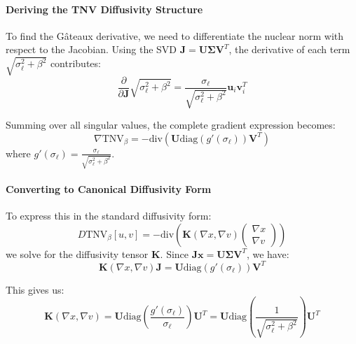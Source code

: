 \paragraph{Deriving the TNV Diffusivity Structure}

To find the Gâteaux derivative, we need to differentiate the nuclear norm with respect to the Jacobian. Using the SVD $\mathbf{J} = \mathbf{U}\boldsymbol{\Sigma}\mathbf{V}^T$, the derivative of each term $\sqrt{\sigma_\ell^2 + \beta^2}$ contributes:
\begin{equation}
\frac{\partial}{\partial \mathbf{J}}\sqrt{\sigma_\ell^2 + \beta^2} = \frac{\sigma_\ell}{\sqrt{\sigma_\ell^2 + \beta^2}} \mathbf{u}_i \mathbf{v}_i^T
\end{equation}

Summing over all singular values, the complete gradient expression becomes:
\begin{equation}
\nabla \text{TNV}_\beta = -\text{div}\left(\mathbf{U} \text{diag}(g'(\sigma_\ell)) \mathbf{V}^T\right)
\end{equation}
where $g'(\sigma_\ell) = \frac{\sigma_\ell}{\sqrt{\sigma_\ell^2 + \beta^2}}$.

\paragraph{Converting to Canonical Diffusivity Form}

To express this in the standard diffusivity form:
\begin{equation}
D\text{TNV}_\beta[u,v] = -\text{div}\left(\mathbf{K}(\nabla x, \nabla v) \begin{pmatrix} \nabla x \\ \nabla v \end{pmatrix}\right)
\end{equation}
we solve for the diffusivity tensor $\mathbf{K}$. Since $\mathbf{J} \mathbf{x} = \mathbf{U}\boldsymbol{\Sigma}\mathbf{V}^T$, we have:
\begin{equation}
\mathbf{K}(\nabla x, \nabla v) \mathbf{J} = \mathbf{U} \text{diag}(g'(\sigma_\ell)) \mathbf{V}^T
\end{equation}

This gives us:
\begin{equation}
\mathbf{K}(\nabla x, \nabla v) = \mathbf{U} \text{diag}\left(\frac{g'(\sigma_\ell)}{\sigma_\ell}\right) \mathbf{U}^T = \mathbf{U} \text{diag}\left(\frac{1}{\sqrt{\sigma_\ell^2 + \beta^2}}\right) \mathbf{U}^T
\end{equation}

